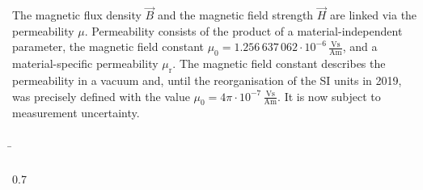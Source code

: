 \begin{frame}
{        The magnetic flux density $\vec{B}$ and the magnetic field strength $\vec{H}$ are linked via the permeability $\mu$. Permeability consists of the product of a material-independent parameter, the magnetic field
		constant $\mu_0=1.256\,637\,062\cdot10^{-6}\,\frac{\mathrm{Vs}}{\mathrm{Am}}$, and a material-specific permeability $\mu_{\mathrm{r}}$. The magnetic field constant describes the permeability in a vacuum and, until
		the reorganisation of the SI units in 2019, was precisely defined with the value $\mu_0 = 4\pi\cdot10^{-7}\,\frac{\mathrm{Vs}}{\mathrm{Am}}$. It is now subject to measurement uncertainty.

	}
	\b{
		\begin{columns}
			\begin{column}{0.7\textwidth}
				\begin{minipage}{0.8\textwidth}
\end{minipage}
\end{column}
\end{columns}}
\end{frame}
